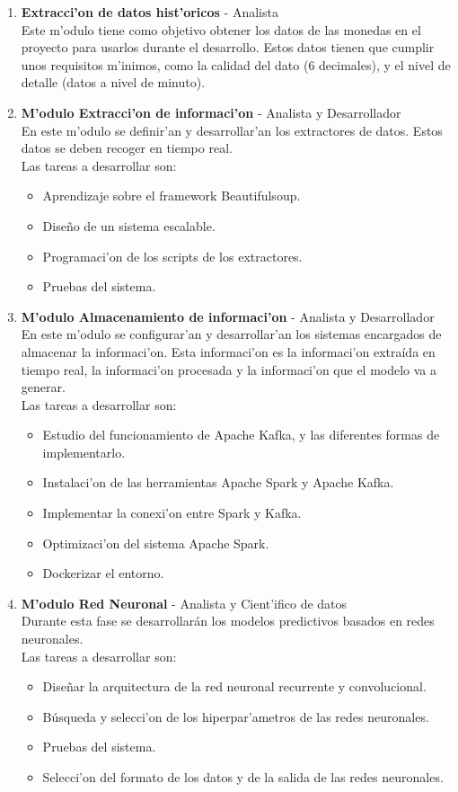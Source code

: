 \begin{enumerate}
\item \textbf{Extracci'on de datos hist'oricos} - Analista\\
Este m'odulo tiene como objetivo obtener los datos de las monedas en el proyecto para usarlos durante el desarrollo. Estos datos tienen que cumplir unos requisitos m'inimos, como la calidad del dato (6 decimales), y el nivel de detalle (datos a nivel de minuto).


\item \textbf{M'odulo Extracci'on de informaci'on} - Analista y Desarrollador\\
En este m'odulo se definir'an y desarrollar'an los extractores de datos. Estos datos se deben recoger en tiempo real.\\
Las tareas a desarrollar son:
\begin{itemize}
\item Aprendizaje sobre el framework Beautifulsoup.
\item Diseño de un sistema escalable.
\item Programaci'on de los scripts de los extractores.
\item Pruebas del sistema.
\end{itemize}


\item \textbf{M'odulo Almacenamiento de informaci'on} - Analista y Desarrollador\\
En este m'odulo se configurar'an y desarrollar'an los sistemas encargados de almacenar la informaci'on. Esta informaci'on es la informaci'on extraída en tiempo real, la informaci'on procesada y la informaci'on que el modelo va a generar.\\
Las tareas a desarrollar son:
\begin{itemize}
\item Estudio del funcionamiento de Apache Kafka, y las diferentes formas de implementarlo.
\item Instalaci'on de las herramientas Apache Spark y Apache Kafka.
\item Implementar la conexi'on entre Spark y Kafka.
\item Optimizaci'on del sistema Apache Spark.
\item Dockerizar el entorno.
\end{itemize}



\item \textbf{M'odulo Red Neuronal} - Analista y Cient'ifico de datos\\
Durante esta fase se desarrollarán los modelos predictivos basados en redes neuronales.\\
Las tareas a desarrollar son:
\begin{itemize}
\item Diseñar la arquitectura de la red neuronal recurrente y convolucional.
\item Búsqueda y selecci'on de los hiperpar'ametros de las redes neuronales.
\item Pruebas del sistema.
\item Selecci'on del formato de los datos y de la salida de las redes neuronales.
\end{itemize}



\end{enumerate}
